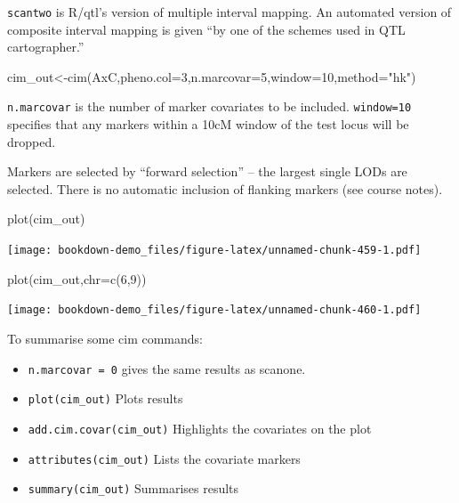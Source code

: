 \documentclass[
]{book}
\newenvironment{Shaded}{\begin{snugshade}}{\end{snugshade}}
\newcommand{\AttributeTok}[1]{\textcolor[rgb]{0.77,0.63,0.00}{#1}}
\newcommand{\DecValTok}[1]{\textcolor[rgb]{0.00,0.00,0.81}{#1}}
\newcommand{\FunctionTok}[1]{\textcolor[rgb]{0.00,0.00,0.00}{#1}}
\newcommand{\NormalTok}[1]{#1}
\newcommand{\OtherTok}[1]{\textcolor[rgb]{0.56,0.35,0.01}{#1}}
\newcommand{\StringTok}[1]{\textcolor[rgb]{0.31,0.60,0.02}{#1}}
\providecommand{\tightlist}{%
  \setlength{\itemsep}{0pt}\setlength{\parskip}{0pt}}
\begin{document}
\texttt{scantwo} is R/qtl's version of multiple interval mapping. An automated version of composite interval mapping is given ``by one of the schemes used in QTL cartographer.''

\begin{Shaded}
\begin{Highlighting}[]
\NormalTok{cim\_out}\OtherTok{\textless{}{-}}\FunctionTok{cim}\NormalTok{(AxC,}\AttributeTok{pheno.col=}\DecValTok{3}\NormalTok{,}\AttributeTok{n.marcovar=}\DecValTok{5}\NormalTok{,}\AttributeTok{window=}\DecValTok{10}\NormalTok{,}\AttributeTok{method=}\StringTok{"hk"}\NormalTok{) }
\end{Highlighting}
\end{Shaded}

\texttt{n.marcovar} is the number of marker covariates to be included. \texttt{window=10} specifies that any markers within a 10cM window of the test locus will be dropped.

Markers are selected by ``forward selection'' -- the largest single LODs are selected. There is no automatic inclusion of flanking markers (see course notes).

\begin{Shaded}
\begin{Highlighting}[]
\FunctionTok{plot}\NormalTok{(cim\_out) }
\end{Highlighting}
\end{Shaded}

\texttt{[image: bookdown-demo\_files/figure-latex/unnamed-chunk-459-1.pdf]}

\begin{Shaded}
\begin{Highlighting}[]
\FunctionTok{plot}\NormalTok{(cim\_out,}\AttributeTok{chr=}\FunctionTok{c}\NormalTok{(}\DecValTok{6}\NormalTok{,}\DecValTok{9}\NormalTok{)) }
\end{Highlighting}
\end{Shaded}

\texttt{[image: bookdown-demo\_files/figure-latex/unnamed-chunk-460-1.pdf]}

To summarise some cim commands:

\begin{itemize}
\tightlist
\item
  \texttt{n.marcovar\ =\ 0} gives the same results as scanone.
\item
  \texttt{plot(cim\_out)} Plots results
\item
  \texttt{add.cim.covar(cim\_out)} Highlights the covariates on the plot
\item
  \texttt{attributes(cim\_out)} Lists the covariate markers
\item
  \texttt{summary(cim\_out)} Summarises results
\end{itemize}
\end{document}
